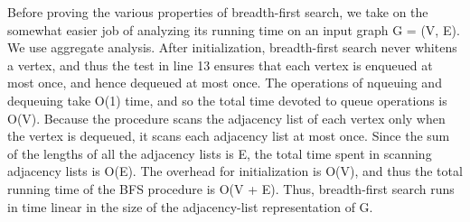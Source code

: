 \documentclass[preview]{standalone}
\begin{document}
\begin{center}
Before proving the various properties of breadth-first search, we take on the somewhat easier job of analyzing its running time on an input graph G = (V, E). We use aggregate analysis. After initialization, breadth-first search never whitens a vertex, and thus the test in line 13 ensures that each vertex is enqueued at most once, and hence dequeued at most once. The operations of nqueuing and dequeuing take O(1) time, and so the total time devoted to queue operations is O(V). Because the procedure scans the adjacency list of each vertex only when the vertex is dequeued, it scans each adjacency list at most once. Since the sum of the lengths of all the adjacency lists is E, the total time spent in scanning adjacency lists is O(E). The overhead for initialization is O(V), and thus the total running time of the BFS procedure is O(V + E). Thus, breadth-first search runs in time linear in the size of the adjacency-list representation of G.
\end{center}
\end{document}
